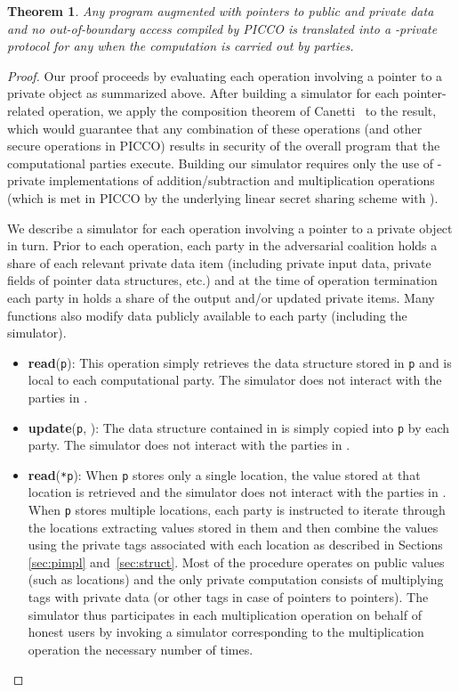 \documentclass[11pt]{article}
\newtheorem{theorem}{Theorem}
\begin{document}
\begin{theorem} \label{thm:security}
Any program  augmented with pointers to public and private data and no
out-of-boundary access compiled by PICCO is translated into a -private
protocol for any  when the computation is carried out by 
parties.
\end{theorem}

\begin{proof}
Our proof proceeds by evaluating each operation involving a pointer to
a private object as summarized above. After building a simulator for
each pointer-related operation, we apply the composition theorem of
Canetti~\cite{can00} to the result, which would guarantee that any
combination of these operations (and other secure operations in PICCO)
results in security of the overall program  that the computational
parties execute. Building our simulator requires only the use of -private
implementations of addition/subtraction and multiplication operations (which
is met in PICCO by the underlying linear secret sharing scheme with ).

We describe a simulator for each operation involving a pointer to a private
object in turn. Prior to each operation, each party in the adversarial
coalition  holds a share of each relevant private data item (including
private input data, private fields of pointer data structures, etc.) and at
the time of operation termination each party in  holds a share of the
output and/or updated private items. Many functions also modify data
publicly available to each party (including the simulator).
\begin{itemize}
  \item \textbf{read}(\texttt{p}): This operation simply retrieves the data
    structure stored in \texttt{p} and is local to each computational party.
    The simulator does not interact with the parties in .
    
  \item \textbf{update}(\texttt{p}, ): The data structure contained in
     is simply copied into \texttt{p} by each party. The simulator does
    not interact with the parties in .
    
  \item \textbf{read}(\texttt{*p}): When \texttt{p} stores only a single
    location, the value stored at that location is retrieved and the
    simulator does not interact with the parties in . When
    \texttt{p} stores multiple locations, each party is instructed to
    iterate through the locations extracting values stored in them and
    then combine the values using the private tags associated with
    each location as described in Sections \ref{sec:pimpl}
    and~\ref{sec:struct}. Most of the procedure operates on public
    values (such as locations) and the only private computation
    consists of multiplying tags with private data (or other tags in
    case of pointers to pointers). The simulator thus participates in
    each multiplication operation on behalf of honest users by
    invoking a simulator corresponding to the multiplication operation
    the necessary number of times.
    

\end{itemize}
\end{proof}
\end{document}
